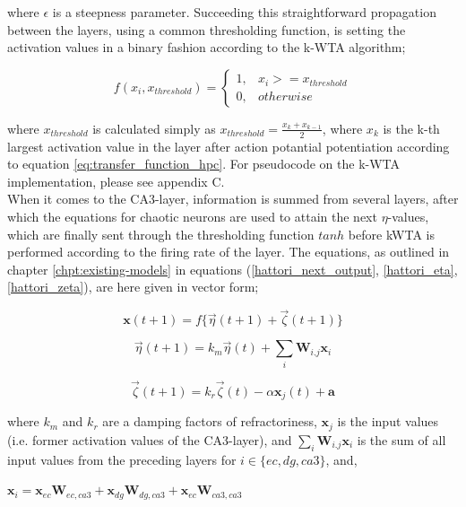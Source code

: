 where $\epsilon$ is a steepness parameter. Succeeding this straightforward propagation between the layers, using a common thresholding function, is setting the activation values in a binary fashion according to the k-WTA algorithm;

\begin{equation}
    f(x_i, x_{threshold}) = \begin{cases}
    1, & x_i >= x_{threshold} \\
    0, & otherwise
    \end{cases}
\end{equation}

where $x_{threshold}$ is calculated simply as $x_{threshold} = \frac{x_{k} + x_{k-1}}{2}$, where $x_k$ is the k-th largest activation value in the layer after action potantial potentiation according to equation \ref{eq:transfer_function_hpc}. For pseudocode on the k-WTA implementation, please see appendix C.
\\

When it comes to the CA3-layer, information is summed from several layers, after which the equations for chaotic neurons are used to attain the next $\eta$-values, which are finally sent through the thresholding function $tanh$ before kWTA is performed according to the firing rate of the layer. The equations, as outlined in chapter \ref{chpt:existing-models} in equations (\ref{hattori_next_output}, \ref{hattori_eta}, \ref{hattori_zeta}), are here given in vector form;

\begin{equation}\label{eq:eta_zeta_sum}
    \textbf{x}(t+1) = f\{ \vec{\eta}(t+1) + \vec{\zeta}(t+1) \}
\end{equation}

\begin{equation}
    \vec{\eta}(t+1) = k_m \vec{\eta}(t) + \sum_{i} \textbf{W}_{i.j} \textbf{x}_i
\end{equation}

\begin{equation}
    \vec{\zeta}(t+1) = k_r \vec{\zeta}(t) - \alpha \textbf{x}_j(t) + \textbf{a}
\end{equation}

where $k_m$ and $k_r$ are a damping factors of refractoriness, $\textbf{x}_j$ is the input values (i.e. former activation values of the CA3-layer), and $\sum_{i} \textbf{W}_{i.j} \textbf{x}_i$ is the sum of all input values from the preceding layers for $i\in\{ec, dg, ca3\}$, and,

\begin{center}
\begin{math}
    \textbf{x}_i = \textbf{x}_{ec} \textbf{W}_{ec, ca3} + \textbf{x}_{dg} \textbf{W}_{dg, ca3} + \textbf{x}_{ec} \textbf{W}_{ca3, ca3}
\end{math}
\end{center}


